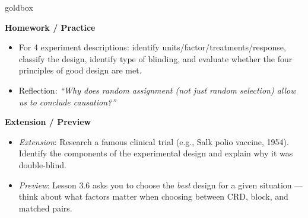 \documentclass[10pt]{article}
\begin{document}
\begin{skillbox}{goldbox}
\begin{minipage}[t]{0.48\linewidth}
    \textbf{Homework / Practice}
    \begin{itemize}
        \item For 4 experiment descriptions: identify units/factor/treatments/response,
              classify the design, identify type of blinding, and evaluate whether the
              four principles of good design are met.
        \item Reflection: \textit{``Why does random \emph{assignment} (not just random
              selection) allow us to conclude causation?''}
    \end{itemize}
\end{minipage}
\hfill
\begin{minipage}[t]{0.48\linewidth}
    \textbf{Extension / Preview}
    \begin{itemize}
        \item \textit{Extension}: Research a famous clinical trial (e.g., Salk
              polio vaccine, 1954). Identify the components of the experimental design
              and explain why it was double-blind.
        \item \textit{Preview}: Lesson 3.6 asks you to choose the \emph{best} design
              for a given situation --- think about what factors matter when choosing
              between CRD, block, and matched pairs.
    \end{itemize}
\end{minipage}
\end{skillbox}
\end{document}

